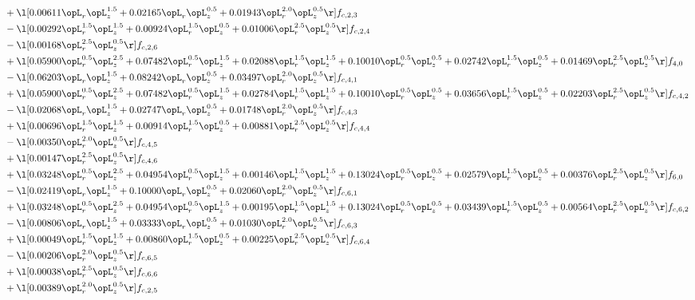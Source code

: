 \begin{alignat}{2}
& + \l[  0.00611 \opL_r \opL_z^{1.5} +  0.02165 \opL_r \opL_z^{0.5} +  0.01943 \opL_r^{2.0} \opL_z^{0.5}  \r] f_{c,2,3} \nonumber \\ 
& - \l[  0.00292 \opL_r^{1.5} \opL_z^{1.5} +  0.00924 \opL_r^{1.5} \opL_z^{0.5} +  0.01006 \opL_r^{2.5} \opL_z^{0.5}  \r] f_{c,2,4} \nonumber \\ 
& - \l[  0.00168 \opL_r^{2.5} \opL_z^{0.5}  \r] f_{c,2,6} \nonumber \\ 
& + \l[  0.05900 \opL_r^{0.5} \opL_z^{2.5} +  0.07482 \opL_r^{0.5} \opL_z^{1.5} +  0.02088 \opL_r^{1.5} \opL_z^{1.5} +  0.10010 \opL_r^{0.5} \opL_z^{0.5} +  0.02742 \opL_r^{1.5} \opL_z^{0.5} +  0.01469 \opL_r^{2.5} \opL_z^{0.5}  \r] f_{4,0} \nonumber \\ 
& - \l[  0.06203 \opL_r \opL_z^{1.5} +  0.08242 \opL_r \opL_z^{0.5} +  0.03497 \opL_r^{2.0} \opL_z^{0.5}  \r] f_{c,4,1} \nonumber \\ 
& + \l[  0.05900 \opL_r^{0.5} \opL_z^{2.5} +  0.07482 \opL_r^{0.5} \opL_z^{1.5} +  0.02784 \opL_r^{1.5} \opL_z^{1.5} +  0.10010 \opL_r^{0.5} \opL_z^{0.5} +  0.03656 \opL_r^{1.5} \opL_z^{0.5} +  0.02203 \opL_r^{2.5} \opL_z^{0.5}  \r] f_{c,4,2} \nonumber \\ 
& - \l[  0.02068 \opL_r \opL_z^{1.5} +  0.02747 \opL_r \opL_z^{0.5} +  0.01748 \opL_r^{2.0} \opL_z^{0.5}  \r] f_{c,4,3} \nonumber \\ 
& + \l[  0.00696 \opL_r^{1.5} \opL_z^{1.5} +  0.00914 \opL_r^{1.5} \opL_z^{0.5} +  0.00881 \opL_r^{2.5} \opL_z^{0.5}  \r] f_{c,4,4} \nonumber \\ 
& - \l[  0.00350 \opL_r^{2.0} \opL_z^{0.5}  \r] f_{c,4,5} \nonumber \\ 
& + \l[  0.00147 \opL_r^{2.5} \opL_z^{0.5}  \r] f_{c,4,6} \nonumber \\ 
& + \l[  0.03248 \opL_r^{0.5} \opL_z^{2.5} +  0.04954 \opL_r^{0.5} \opL_z^{1.5} +  0.00146 \opL_r^{1.5} \opL_z^{1.5} +  0.13024 \opL_r^{0.5} \opL_z^{0.5} +  0.02579 \opL_r^{1.5} \opL_z^{0.5} +  0.00376 \opL_r^{2.5} \opL_z^{0.5}  \r] f_{6,0} \nonumber \\ 
& - \l[  0.02419 \opL_r \opL_z^{1.5} +  0.10000 \opL_r \opL_z^{0.5} +  0.02060 \opL_r^{2.0} \opL_z^{0.5}  \r] f_{c,6,1} \nonumber \\ 
& + \l[  0.03248 \opL_r^{0.5} \opL_z^{2.5} +  0.04954 \opL_r^{0.5} \opL_z^{1.5} +  0.00195 \opL_r^{1.5} \opL_z^{1.5} +  0.13024 \opL_r^{0.5} \opL_z^{0.5} +  0.03439 \opL_r^{1.5} \opL_z^{0.5} +  0.00564 \opL_r^{2.5} \opL_z^{0.5}  \r] f_{c,6,2} \nonumber \\ 
& - \l[  0.00806 \opL_r \opL_z^{1.5} +  0.03333 \opL_r \opL_z^{0.5} +  0.01030 \opL_r^{2.0} \opL_z^{0.5}  \r] f_{c,6,3} \nonumber \\ 
& + \l[  0.00049 \opL_r^{1.5} \opL_z^{1.5} +  0.00860 \opL_r^{1.5} \opL_z^{0.5} +  0.00225 \opL_r^{2.5} \opL_z^{0.5}  \r] f_{c,6,4} \nonumber \\ 
& - \l[  0.00206 \opL_r^{2.0} \opL_z^{0.5}  \r] f_{c,6,5} \nonumber \\ 
& + \l[  0.00038 \opL_r^{2.5} \opL_z^{0.5}  \r] f_{c,6,6} \nonumber \\ 
& + \l[  0.00389 \opL_r^{2.0} \opL_z^{0.5}  \r] f_{c,2,5} \nonumber \\ 
\end{alignat} 


